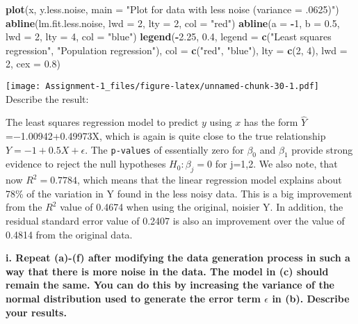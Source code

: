 \documentclass[
]{article}
\newenvironment{Shaded}{\begin{snugshade}}{\end{snugshade}}
\newcommand{\AttributeTok}[1]{\textcolor[rgb]{0.13,0.29,0.53}{#1}}
\newcommand{\DecValTok}[1]{\textcolor[rgb]{0.00,0.00,0.81}{#1}}
\newcommand{\FloatTok}[1]{\textcolor[rgb]{0.00,0.00,0.81}{#1}}
\newcommand{\FunctionTok}[1]{\textcolor[rgb]{0.13,0.29,0.53}{\textbf{#1}}}
\newcommand{\NormalTok}[1]{#1}
\newcommand{\SpecialCharTok}[1]{\textcolor[rgb]{0.81,0.36,0.00}{\textbf{#1}}}
\newcommand{\StringTok}[1]{\textcolor[rgb]{0.31,0.60,0.02}{#1}}
\begin{document}
\begin{Shaded}
\begin{Highlighting}[]
\FunctionTok{plot}\NormalTok{(x, y.less.noise, }\AttributeTok{main =} \StringTok{"Plot for data with less noise (variance = .0625)"}\NormalTok{)}
\FunctionTok{abline}\NormalTok{(lm.fit.less.noise, }\AttributeTok{lwd =} \DecValTok{2}\NormalTok{, }\AttributeTok{lty =} \DecValTok{2}\NormalTok{, }\AttributeTok{col =} \StringTok{"red"}\NormalTok{)}
\FunctionTok{abline}\NormalTok{(}\AttributeTok{a =} \SpecialCharTok{{-}}\DecValTok{1}\NormalTok{, }\AttributeTok{b =} \FloatTok{0.5}\NormalTok{, }\AttributeTok{lwd =} \DecValTok{2}\NormalTok{, }\AttributeTok{lty =} \DecValTok{4}\NormalTok{, }\AttributeTok{col =} \StringTok{"blue"}\NormalTok{)}
\FunctionTok{legend}\NormalTok{(}\SpecialCharTok{{-}}\FloatTok{2.25}\NormalTok{, }\FloatTok{0.4}\NormalTok{, }\AttributeTok{legend =} \FunctionTok{c}\NormalTok{(}\StringTok{"Least squares regression"}\NormalTok{, }\StringTok{"Population regression"}\NormalTok{), }\AttributeTok{col =} \FunctionTok{c}\NormalTok{(}\StringTok{"red"}\NormalTok{, }\StringTok{"blue"}\NormalTok{), }
       \AttributeTok{lty =} \FunctionTok{c}\NormalTok{(}\DecValTok{2}\NormalTok{, }\DecValTok{4}\NormalTok{), }\AttributeTok{lwd =} \DecValTok{2}\NormalTok{, }\AttributeTok{cex =} \FloatTok{0.8}\NormalTok{)}
\end{Highlighting}
\end{Shaded}

\texttt{[image: Assignment-1\_files/figure-latex/unnamed-chunk-30-1.pdf]}
Describe the result:

The least squares regression model to predict \(y\) using \(x\) has the
form \(\hat{Y}\)=−1.00942+0.49973X, which is again is quite close to the
true relationship \(Y=−1+0.5X+\epsilon\). The \texttt{p-values} of
essentially zero for \(\beta_0\) and \(\beta_1\) provide strong evidence
to reject the null hypotheses \(H_0:\beta_j=0\) for j=1,2. We also note,
that now \(R^2=0.7784\), which means that the linear regression model
explains about 78\% of the variation in Y found in the less noisy data.
This is a big improvement from the \(R^2\) value of 0.4674 when using
the original, noisier Y. In addition, the residual standard error value
of 0.2407 is also an improvement over the value of 0.4814 from the
original data.

\textbf{i. Repeat (a)-(f) after modifying the data generation process in
such a way that there is more noise in the data. The model in (c) should
remain the same. You can do this by increasing the variance of the
normal distribution used to generate the error term \(\epsilon\) in (b).
Describe your results.}
\end{document}
